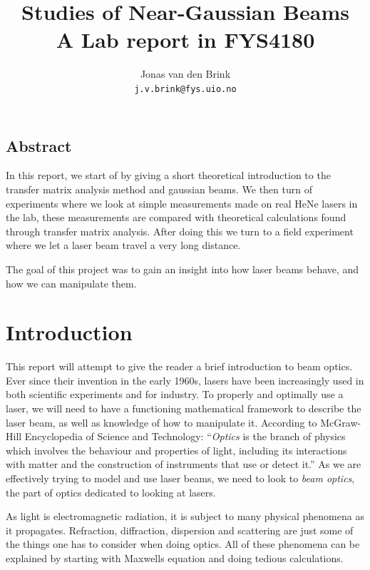 \documentclass[a4paper, 11pt, notitlepage, english]{article}
\author{Jonas van den Brink \\ \texttt{j.v.brink@fys.uio.no}}
\title{Studies of Near-Gaussian Beams  \\ A Lab report in FYS4180}
\begin{document}
\maketitle

\tableofcontents

\clearpage



\subsection*{Abstract}

In this report, we start of by giving a short theoretical introduction to the transfer matrix analysis method and gaussian beams. We then turn of experiments where we look at simple measurements made on real HeNe lasers in the lab, these measurements are compared with theoretical calculations found through transfer matrix analysis. After doing this we turn to a field experiment where we let a laser beam travel a very long distance.

The goal of this project was to gain an insight into how laser beams behave, and how we can manipulate them.

\section{Introduction}

This report will attempt to give the reader a brief introduction to beam optics. Ever since their invention in the early 1960s, lasers have been increasingly used in both scientific experiments and for industry. To properly and optimally use a laser, we will need to have a functioning mathematical framework to describe the laser beam, as well as knowledge of how to manipulate it. According to McGraw-Hill Encyclopedia of Science and Technology: ``\emph{Optics} is the branch of physics which involves the behaviour and properties of light, including its interactions with matter and the construction of instruments that use or detect it.'' As we are effectively trying to model and use laser beams, we need to look to \emph{beam optics}, the part of optics dedicated to looking at lasers. 

As light is electromagnetic radiation, it is subject to many physical phenomena as it propagates. Refraction, diffraction, dispersion and scattering are just some of the things one has to consider when doing optics. All of these phenomena can be explained by starting with Maxwells equation and doing tedious calculations. 
\end{document}
